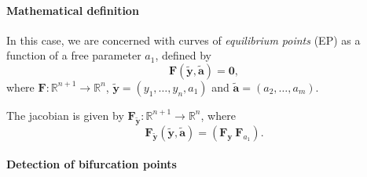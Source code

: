 \documentclass{article}[12pt]
\def\bF{\bm{F}}
\def\by{\bm{y}}
\def\bty{\bm{\tilde{y}}}
\def\bta{\bm{\tilde{a}}}
\def\bzero{\bm{0}}
\begin{document}
\paragraph{Mathematical definition}

In this case, we are concerned with curves of {\it equilibrium points} (EP) as a function of a free parameter $a_{1}$, defined by
\[
\bF(\bty,\bta) = \bzero,
\]
where $\bF:\mathbb{R}^{n+1} \rightarrow \mathbb{R}^{n}$, $\bty = (y_{1},\ldots,y_{n},a_{1})$ and $\bta = (a_{2},\ldots,a_{m})$.

\begin{center}
\end{center}

The jacobian is given by $\bF_{\bty} : \mathbb{R}^{n+1} \rightarrow \mathbb{R}^{n}$, where
\[
\bm{F}_{\bty}(\bty,\bta) = \left(\bF_{\by} \ \bF_{a_{1}}\right).
\]

\paragraph{Detection of bifurcation points}
\end{document}
